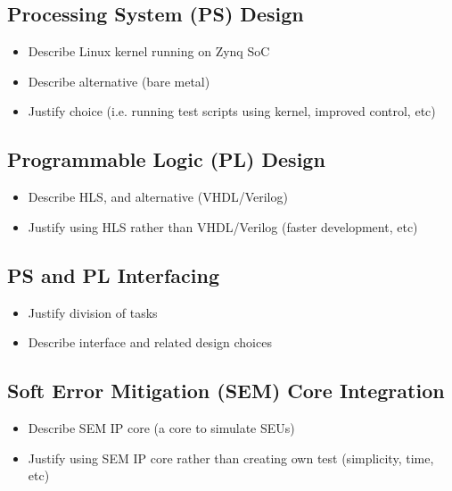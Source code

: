 \documentclass[12pt]{article}
\begin{document}
\subsection{Processing System (PS) Design}
\label{sec:Design-PS}
\vspace{-12pt}

\begin{itemize}
\item Describe Linux kernel running on Zynq SoC
\item Describe alternative (bare metal)
\item Justify choice (i.e. running test scripts using kernel, improved control, etc)
\end{itemize}

\subsection{Programmable Logic (PL) Design}
\label{sec:Design-PL}
\vspace{-12pt}

\begin{itemize}
\item Describe HLS, and alternative (VHDL/Verilog)
\item Justify using HLS rather than VHDL/Verilog (faster development, etc)
\end{itemize}

\subsection{PS and PL Interfacing}
\label{sec:Design-PSnPL}
\vspace{-12pt}

\begin{itemize}
\item Justify division of tasks
\item Describe interface and related 	design choices
\end{itemize}

\subsection{Soft Error Mitigation (SEM) Core Integration}
\label{sec:Design-SEM}
\vspace{-12pt}

\begin{itemize}
\item Describe SEM IP core (a core to simulate SEUs)
\item Justify using SEM IP core rather than creating own test (simplicity, time, etc)
\end{itemize}
\end{document}
